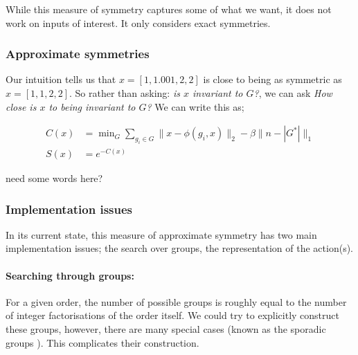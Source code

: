 While this measure of symmetry captures some of what we want, it does not work on inputs of interest.
It only considers exact symmetries.

\subsubsection{Approximate symmetries}

Our intuition tells us that $x = [1,1.001,2,2]$ is close to being as symmetric as
$x = [1,1,2,2]$. So rather than asking: \textit{is $x$ invariant to $G$?}, we can ask
\textit{How close is $x$ to being invariant to $G$?} We can write this as;


\begin{align*}
C(x) &= \mathop{\text{min}}_G \sum_{g_i\in G}\parallel x-\phi(g_i, x)\parallel_2 - \beta \parallel n-|G^{* }| \parallel_1\\
S(x) &= e^{-C(x)}
\end{align*}


{\color{red}need some words here?}

\subsubsection{Implementation issues}

In its current state, this measure of approximate symmetry has two main implementation issues;
the search over groups, the representation of the action(s).

\paragraph{Searching through groups:}\label{searching-through-groups} For a given order, the number of possible
groups is roughly equal to the number of integer factorisations of the order itself.
We could try to explicitly construct these groups, however, there are many special cases (known as the sporadic groups \cite{Conway1985}).
This complicates their construction\footnotemark[38].



